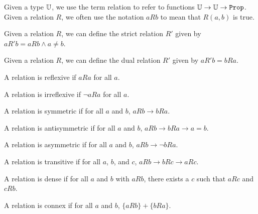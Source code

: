 \documentclass[../../math.tex]{subfiles}
\begin{document}
\begin{definition}
    Given a type $\mathbb{U}$, we use the term relation to refer to functions $\U
    \rightarrow \U \rightarrow \vtt{Prop}$.  Given a relation $R$, we often use
    the notation $aRb$ to mean that $R(a, b)$ is true.
\end{definition}

\begin{definition}
    Given a relation $R$, we can define the strict relation $R'$ given by $aR'b
    = aRb \wedge a \neq b$.
\end{definition}

\begin{definition}
    Given a relation $R$, we can define the dual relation $R'$ given by $aR'b =
    bRa$.
\end{definition}

\begin{class}
    A relation is reflexive if $aRa$ for all $a$.
\end{class}

\begin{class}
    A relation is irreflexive if $\neg aRa$ for all $a$.
\end{class}

\begin{class}
    A relation is symmetric if for all $a$ and $b$, $aRb \rightarrow bRa$.
\end{class}

\begin{class}
    A relation is antisymmetric if for all $a$ and $b$, $aRb \rightarrow bRa
    \rightarrow a = b$.
\end{class}

\begin{class}
    A relation is asymmetric if for all $a$ and $b$, $aRb \rightarrow \neg bRa$.
\end{class}

\begin{class}
    A relation is transitive if for all $a$, $b$, and $c$, $aRb \rightarrow bRc
    \rightarrow aRc$.
\end{class}

\begin{class}
    A relation is dense if for all $a$ and $b$ with $aRb$, there exists a $c$
    such that $aRc$ and $cRb$.
\end{class}

\begin{class}
    A relation is connex if for all $a$ and $b$, $\{aRb\} + \{bRa\}$.
\end{class}
\end{document}
